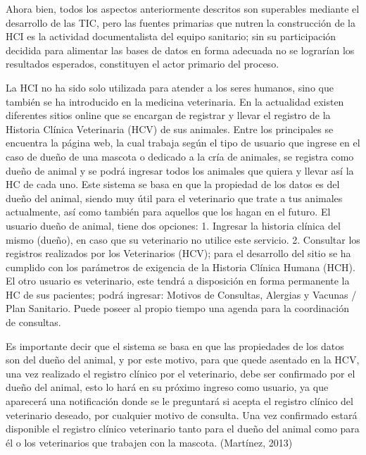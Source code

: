 Ahora bien, todos los aspectos anteriormente descritos son superables mediante el desarrollo de las TIC, pero las fuentes primarias que nutren la construcción de la HCI es la actividad documentalista del equipo sanitario; sin su participación decidida para alimentar las bases de datos en forma adecuada no se lograrían los resultados esperados, constituyen el actor primario del proceso.  

La HCI no ha sido solo utilizada para atender a los seres humanos, sino que también se ha introducido en la medicina veterinaria. En la actualidad existen diferentes sitios online que se encargan de registrar y llevar el registro de la Historia Clínica Veterinaria (HCV) de sus animales. Entre los principales se encuentra la página web, la cual trabaja según el tipo de usuario que ingrese en el caso de dueño de una mascota o dedicado a la cría de animales, se registra como dueño de animal y se podrá ingresar todos los animales que quiera y llevar así la HC de cada uno. Este sistema se basa en que la propiedad de los datos es del dueño del animal, siendo muy útil para el veterinario que trate a tus animales actualmente, así como también para aquellos que los hagan en el futuro. El usuario dueño de animal, tiene dos opciones:  1. Ingresar la historia clínica del mismo (dueño), en caso que su veterinario no utilice este servicio. 2. Consultar los registros realizados por los Veterinarios (HCV); para el desarrollo del sitio se ha cumplido con los parámetros de exigencia de la Historia Clínica Humana (HCH). El otro usuario es veterinario, este tendrá a disposición en forma permanente la HC de sus pacientes; podrá ingresar: Motivos de Consultas, Alergias y Vacunas / Plan Sanitario. Puede poseer al propio tiempo una agenda para la coordinación de consultas.  

Es importante decir que el sistema se basa en que las propiedades de los datos son del dueño del animal, y por este motivo, para que quede asentado en la HCV, una vez realizado el registro clínico por el veterinario, debe ser confirmado por el dueño del animal, esto lo hará en su próximo ingreso como usuario, ya que aparecerá una notificación donde se le preguntará si acepta el registro clínico del veterinario deseado, por cualquier motivo de consulta. Una vez confirmado estará disponible el registro clínico veterinario tanto para el dueño del animal como para él o los veterinarios que trabajen con la mascota. (Martínez, 2013)  
\newline
\newline

